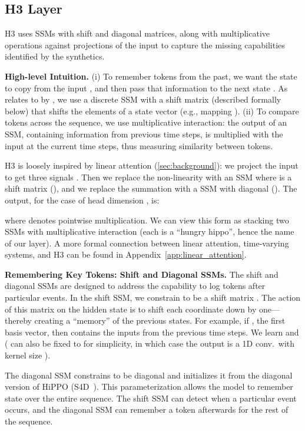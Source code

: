 \documentclass{article}
\newcommand{\hthree}{\textsc{H3}\xspace}
\begin{document}
\subsection{\hthree Layer\label{sec:method_h3}}
\hthree uses SSMs with shift and diagonal matrices, along with multiplicative
operations against projections of the input to capture the missing capabilities identified by the synthetics.

\textbf{High-level Intuition.}
(i) To remember tokens from the past, we want the state  to copy from the input , and then pass that information to the next state . As  relates to by , we use a discrete SSM with a shift matrix  (described formally below) that shifts the elements of a state vector (e.g., mapping ).
(ii) To compare tokens across the sequence, we use multiplicative interaction: the output of an SSM, containing information from previous time steps, is multiplied with the input at the current time steps, thus measuring similarity between tokens.

\hthree is loosely inspired by linear attention (\cref{sec:background}): we project the input  to get three signals .
Then we replace the non-linearity  with an SSM where  is a shift matrix (), and we replace the summation  with a SSM with diagonal  ().
The output, for the case of head dimension , is:

where  denotes pointwise multiplication.
We can view this form as stacking two SSMs with multiplicative
interaction (each is a ``hungry hippo'', hence the name of our layer).
A more formal connection between linear attention, time-varying systems, and \hthree can be found in Appendix~\ref{app:linear_attention}.

\textbf{Remembering Key Tokens: Shift and Diagonal SSMs.}
The shift and diagonal SSMs are designed to address the capability to log tokens after particular events.
In the shift SSM, we constrain  to be a shift matrix
.
The action of this matrix on the hidden state  is to shift each coordinate
down by one---thereby creating a ``memory'' of the previous states.
For example, if , the first basis vector, then
 contains the inputs from the previous 
time steps.
We learn  and  ( can also be fixed to  for
simplicity, in which case the output is a 1D conv.\ with kernel size ).

The diagonal SSM constrains  to be diagonal and initializes it from the diagonal version of HiPPO (S4D~\citep{gu2022parameterization}).
This parameterization allows the model to remember state over the entire sequence.
The shift SSM can detect when a particular event occurs, and the diagonal SSM can remember a token afterwards for the rest of the sequence.
\end{document}

